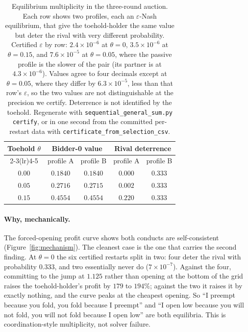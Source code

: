 \documentclass[11pt,a4paper]{article}
\newcommand{\theold}{\theta}   %
\begin{document}
\begin{table}[H]
\centering
\small
\begin{tabular}{ccccc}
\toprule
Toehold $\theold$ & \multicolumn{2}{c}{Bidder-0 value} & \multicolumn{2}{c}{Rival deterrence} \\
\cmidrule(lr){2-3}\cmidrule(lr){4-5}
 & profile A & profile B & profile A & profile B \\
\midrule
$0.00$ & $0.1840$ & $0.1840$ & $0.000$ & $0.333$ \\
$0.05$ & $0.2716$ & $0.2715$ & $0.002$ & $0.333$ \\
$0.15$ & $0.4554$ & $0.4554$ & $0.220$ & $0.333$ \\
\bottomrule
\end{tabular}
\caption{Equilibrium multiplicity in the three-round auction. Each row shows two profiles, each an $\varepsilon$-Nash equilibrium, that give the toehold-holder the same value but deter the rival with very different probability. Certified $\varepsilon$ by row: $2.4\times10^{-6}$ at $\theold=0$, $3.5\times10^{-6}$ at $\theold=0.15$, and $7.6\times10^{-5}$ at $\theold=0.05$, where the passive profile is the slower of the pair (its partner is at $4.3\times10^{-6}$). Values agree to four decimals except at $\theold=0.05$, where they differ by $6.3\times10^{-5}$, less than that row's $\varepsilon$, so the two values are not distinguishable at the precision we certify. Deterrence is not identified by the toehold. Regenerate with \texttt{sequential\_general\_sum.py certify}, or in one second from the committed per-restart data with \texttt{certificate\_from\_selection\_csv}.}
\label{tab:multiplicity}
\end{table}

\paragraph{Why, mechanically.} The forced-opening profit curve shows both conducts are self-consistent (Figure~\ref{fig:mechanism}). The cleanest case is the one that carries the second finding. At $\theold=0$ the six certified restarts split in two: four deter the rival with probability $0.333$, and two essentially never do ($7\times10^{-7}$). Against the four, committing to the jump at $1.125$ rather than opening at the bottom of the grid raises the toehold-holder's profit by $179$ to $194\%$; against the two it raises it by exactly nothing, and the curve peaks at the cheapest opening. So ``I preempt because you fold, you fold because I preempt'' and ``I open low because you will not fold, you will not fold because I open low'' are both equilibria. This is coordination-style multiplicity, not solver failure.
\end{document}
